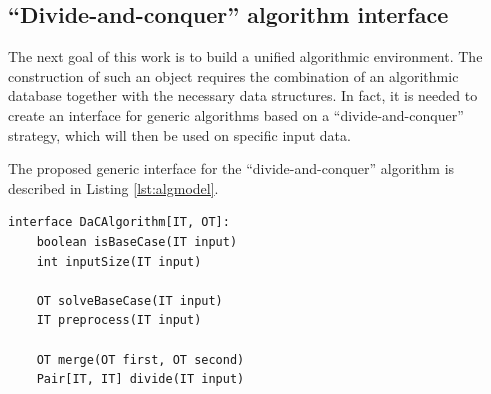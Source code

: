 \documentclass[a4paper,english,numberwithinsect,notab]{eurocg20-submission}
\begin{document}
\subsection{``Divide-and-conquer'' algorithm interface}


	The next goal of this work is to build a unified algorithmic environment. The construction of such an object requires the combination of an algorithmic database together with the necessary data structures.  In fact, it is needed to create an interface for generic algorithms based on a ``divide-and-conquer'' strategy, which will then be used on specific input data.
	
	The proposed generic interface for the ``divide-and-conquer'' algorithm is described in Listing \ref{lst:algmodel}.
	
	\begin{lstlisting}[caption={Algorithm model based on the ``divide-and-conquer'' principle},label={lst:algmodel},captionpos=t,float,abovecaptionskip=-\medskipamount]
interface DaCAlgorithm[IT, OT]:
    boolean isBaseCase(IT input)
    int inputSize(IT input)
    
    OT solveBaseCase(IT input)
    IT preprocess(IT input)
    
    OT merge(OT first, OT second)
    Pair[IT, IT] divide(IT input)
	\end{lstlisting}
	
	
	
	
	
\end{document}

